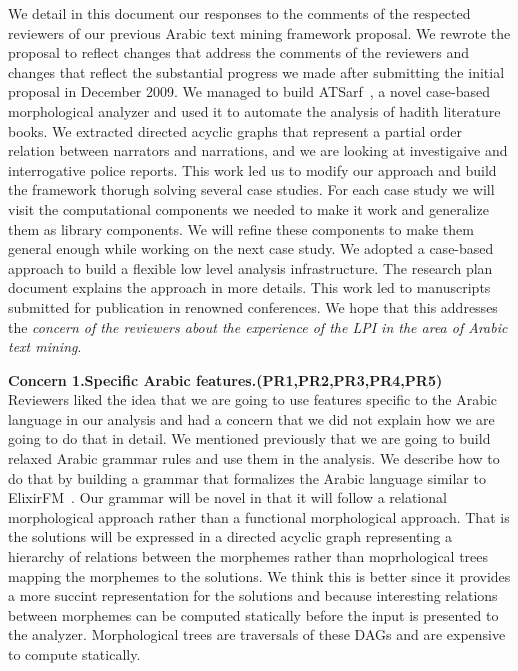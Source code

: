 \documentclass[12pt]{article}
\begin{document}
We detail in this document our responses to the comments of
the respected reviewers of our previous Arabic text mining
framework proposal.
We rewrote the proposal to reflect changes that address the 
comments of the reviewers and changes that reflect the substantial
progress we made after submitting the initial proposal in December 
2009.
We managed to build ATSarf~\cite{ATMine09}, 
a novel case-based morphological analyzer 
and used it to automate the analysis of 
hadith literature books. 
We extracted directed acyclic graphs that 
represent a partial order relation between narrators and narrations,
and we are looking at investigaive and interrogative police reports.
This work led us to modify our approach and build the framework 
thorugh solving several case studies.
For each case study we will visit the computational components we 
needed to make it work and generalize them as library components. 
We will refine these components to make them general enough
while working on the next case study.
We adopted a case-based approach to build a flexible
low level analysis infrastructure.
The research plan document explains the approach in more details. 
This work led to manuscripts submitted for publication in 
renowned conferences. 
We hope that this addresses the {\em concern of 
the reviewers about the experience of the LPI in the area
of Arabic text mining}. 

{\bf Concern 1.Specific Arabic features.(PR1,PR2,PR3,PR4,PR5)~~}
Reviewers liked the idea that we are going to use 
features specific to the Arabic language in our analysis and had
a concern that we did not explain how we are going to do that in 
detail. 
We mentioned previously that we are going to build relaxed
Arabic grammar rules and use them in the analysis. 
We describe how to do that by building a grammar 
that formalizes the Arabic language similar to 
ElixirFM~\cite{Otakar:07}.
Our grammar will be novel in that it will follow a relational 
morphological approach rather than a functional morphological 
approach. 
That is the solutions will be expressed in a directed acyclic graph
representing a hierarchy of relations between the morphemes 
rather than moprhological trees mapping the morphemes to the 
solutions.
We think this is better since it provides a more succint
representation for the solutions and because interesting relations 
between morphemes can be computed statically before
the input is presented to the analyzer.
Morphological trees are traversals of these DAGs and are expensive 
to compute statically. 
\end{document}
